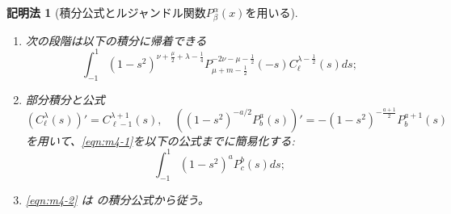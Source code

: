 \documentclass[12pt,a4paper,dvipdfmx]{jsarticle}
\numberwithin{equation}{section}
\theoremstyle{jplain}
\newtheorem{method}{記明法}
\theoremstyle{remark}
\theoremstyle{definition}
\begin{document}
{\begin{method}[積分公式とルジャンドル関数$ P^\alpha_\beta(x)$を用いる]
\begin{enumerate}
{			\begin{equation*}
				\int_{-s}^1(s+t)^{2\nu} {C}_m^\mu(t)(1-t^2)^{\mu-\frac{1}{2}}dt=
				\frac{\sqrt{\pi}\Gamma(2\mu+m)\Gamma(2\nu+1)}{\Gamma(\mu)2^{\mu-\frac{1}{2}}m!}
				(1-s^2)^{\nu+\frac{\mu}{2}+\frac{1}{4}}P_{\mu+m-\frac{1}{2}}^{-2\nu-\mu-\frac{1}{2}}(-s).
			\end{equation*}
		}
		を用いる(ここで、$P_{\mu+m-\frac{1}{2}}^{-2\nu-\mu-\frac{1}{2}}(-x)$
		はルジャンドルの陪関数である);
		\item 次の段階は以下の積分に帰着できる
			\begin{equation}\label{eqn:m4-1}
				\int_{-1}^1(1-s^2)^{\nu+\frac{\mu}{2}+\lambda-\frac{1}{4}}P_{\mu+m-\frac{1}{2}}^{-2\nu-\mu-\frac{1}{2}}(-s)C^{\lambda-\frac{1}{2}}_\ell(s)ds;
			\end{equation}
			
		\item 部分積分と公式
			\begin{equation*}
				\left(C^\lambda_\ell(s)  \right)'=C^{\lambda+1}_{\ell-1}(s),\quad\left((1-s^2)^{-a/2}P^a_b(s) \right)'
			=-(1-s^2)^{-\frac{a+1}{2}}P_b^{a+1}(s)
			\end{equation*}
			を用いて、\eqref{eqn:m4-1}を以下の公式までに簡易化する:
			\begin{equation}\label{eqn:m4-2}
				\int_{-1}^1(1-s^2)^aP^b_c(s)ds;
			\end{equation}
			
		\item \eqref{eqn:m4-2} は \cite[L2]{kobayashi2011schrodinger}の積分公式から従う。
	\end{enumerate}
\end{method}
}
\end{document}
